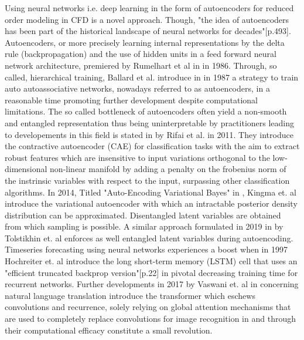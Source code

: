Using neural networks i.e. deep learning in the form of autoencoders for reduced order modeling in CFD is a novel approach. Though, "the idea of autoencoders has been part of the historical landscape of neural networks for decades"\cite{Goodfellow}[p.493]. Autoencoders, or more precisely learning internal representations by the delta rule (backpropagation) and the use of hidden units in a feed forward neural network architecture, premiered by Rumelhart et al in \cite{Rumelhart} in 1986. Through, so called, hierarchical training, Ballard et al. introduce in  \cite{Ballard} in 1987 a strategy to train auto autoassociative networks, nowadays referred to as autoencoders, in a reasonable time promoting further development despite computational limitations. The so called bottleneck of autoencoders often yield a non-smooth and entangled representation thus being uninterpretable by practitioners leading to developements in this field is stated in \cite{Rifai2011} by Rifai et al. in 2011. They introduce the contractive autoencoder (CAE) for classification tasks with the aim to extract robust features which are insensitive to input variations orthogonal to the low-dimensional non-linear manifold by adding a penalty on the frobenius norm of the instrinsic variables with respect to the input, surpassing other classification algorithms. In 2014, Titled "Auto-Encoding Variational Bayes" in \cite{kingma2014autoencoding}, Kingma et. al introduce the variational autoencoder with which an intractable posterior density distribution can be approximated. Disentangled latent variables are obtained from which sampling is possible. A similar approach formulated in 2019 in \cite{tolstikhin2019wasserstein} by Tolstikhin et. al enforces as well entangled latent variables during autoencoding. Timeseries forecasting using neural networks experiences a boost when in 1997 Hochreiter et. al introduce the long short-term memory (LSTM) cell that uses an "efficient truncated backprop version"[p.22] in \cite{HochSchm97} pivotal decreasing training time for recurrent networks. Further developments in 2017 by Vaswani et. al in \cite{vaswani2017attention} concerning natural language translation introduce the transformer which eschews convolutions and recurrence, solely relying on global attention mechanisms that are used to completely replace convolutions for image recognition in \cite{dosovitskiy2021image} and through their computational efficacy constitute a small revolution.

